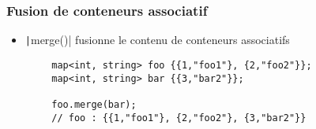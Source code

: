 \documentclass[C++.tex]{subfiles}
\begin{document}
\begin{frame}[fragile]
	\frametitle{Fusion de conteneurs associatif}
	\begin{itemize}
		\item \texttt|merge()| fusionne le contenu de conteneurs associatifs
	\end{itemize}

	\begin{verbatim}
		map<int, string> foo {{1,"foo1"}, {2,"foo2"}};
		map<int, string> bar {{3,"bar2"}};

		foo.merge(bar);
		// foo : {{1,"foo1"}, {2,"foo2"}, {3,"bar2"}}
	\end{verbatim}


\end{frame}
\end{document}
